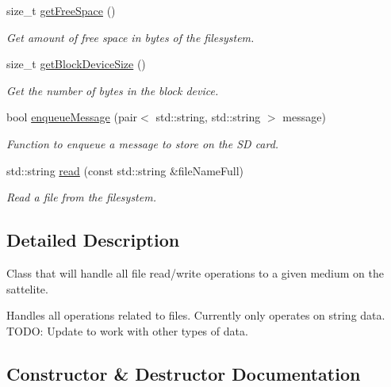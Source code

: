 \begin{DoxyCompactItemize}
size\+\_\+t \mbox{\hyperlink{class_sat_file_handler_ae4b0b4244befa3a3d1fdfc451ae248f0}{get\+Free\+Space}} ()
\begin{DoxyCompactList}\small\item\em Get amount of free space in bytes of the filesystem. \end{DoxyCompactList}\item 
size\+\_\+t \mbox{\hyperlink{class_sat_file_handler_a1a01017636190f9c3e14633564468882}{get\+Block\+Device\+Size}} ()
\begin{DoxyCompactList}\small\item\em Get the number of bytes in the block device. \end{DoxyCompactList}\item 
bool \mbox{\hyperlink{class_sat_file_handler_a9f5a3c0ee440bf5a45f49add4dd2f04d}{enqueue\+Message}} (pair$<$ std\+::string, std\+::string $>$ message)
\begin{DoxyCompactList}\small\item\em Function to enqueue a message to store on the SD card. \end{DoxyCompactList}\item 
std\+::string \mbox{\hyperlink{class_sat_file_handler_a5529b9e3f7ec6ae60db4c9c83fbe6ea8}{read}} (const std\+::string \&file\+Name\+Full)
\begin{DoxyCompactList}\small\item\em Read a file from the filesystem. \end{DoxyCompactList}\end{DoxyCompactItemize}


\subsection{Detailed Description}
Class that will handle all file read/write operations to a given medium on the sattelite. 

Handles all operations related to files. Currently only operates on string data. T\+O\+DO\+: Update to work with other types of data. 

\subsection{Constructor \& Destructor Documentation}
\mbox{\label{class_sat_file_handler_a077c457c3daa568f5415b3d03d01a2a2}} 
